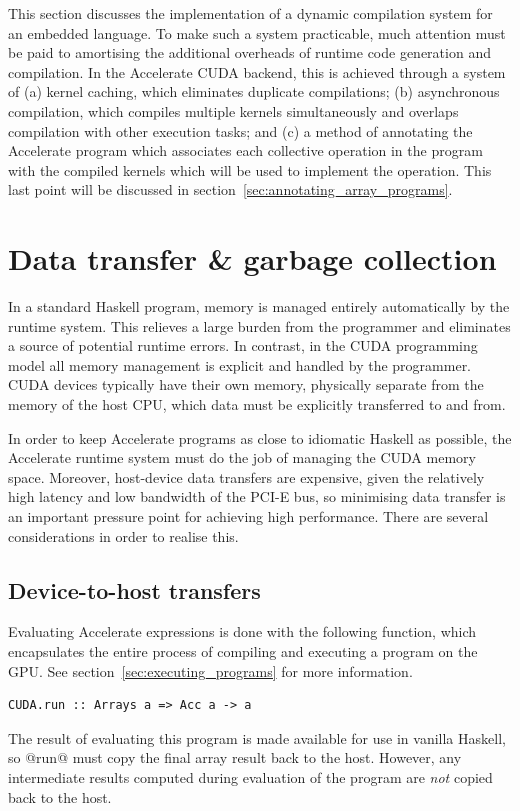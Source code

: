 This section discusses the implementation of a dynamic compilation system for an
embedded language. To make such a system practicable, much attention must be
paid to amortising the additional overheads of runtime code generation and
compilation. In the Accelerate CUDA backend, this is achieved through a system
of (a) kernel caching, which eliminates duplicate compilations; (b) asynchronous
compilation, which compiles multiple kernels simultaneously and overlaps
compilation with other execution tasks; and (c) a method of annotating the
Accelerate program which associates each collective operation in the program
with the compiled kernels which will be used to implement the operation. This
last point will be discussed in section~\ref{sec:annotating_array_programs}.


\section{Data transfer \& garbage collection}
\label{sec:memory_management}

In a standard Haskell program, memory is managed entirely automatically by the
runtime system. This relieves a large burden from the programmer and eliminates
a source of potential runtime errors. In contrast, in the CUDA programming model
all memory management is explicit and handled by the programmer. CUDA devices
typically have their own memory, physically separate from the memory of the host
CPU, which data must be explicitly transferred to and from.

In order to keep Accelerate programs as close to idiomatic Haskell as possible,
the Accelerate runtime system must do the job of managing the CUDA memory
space. Moreover, host-device data transfers are expensive, given the relatively
high latency and low bandwidth of the PCI-E bus, so minimising data transfer is
an important pressure point for achieving high performance. There are several
considerations in order to realise this.



\subsection{Device-to-host transfers}

Evaluating Accelerate expressions is done with the following function, which
encapsulates the entire process of compiling and executing a program on the
GPU\@. See section~\ref{sec:executing_programs} for more information.
%
\begin{lstlisting}[style=haskell,numbers=none]
CUDA.run :: Arrays a => Acc a -> a
\end{lstlisting}
%
The result of evaluating this program is made available for use in vanilla
Haskell, so @run@ must copy the final array result back to the host.
However, any intermediate results computed during evaluation of the program are
\emph{not} copied back to the host.


